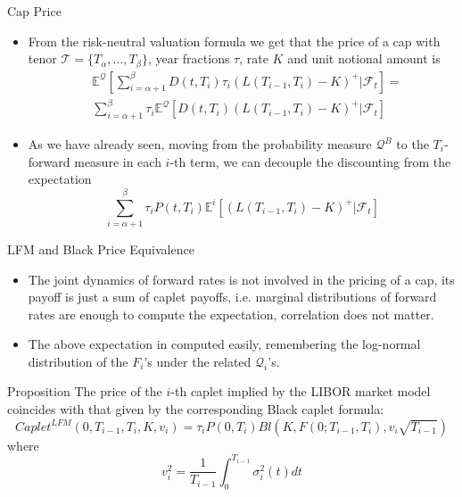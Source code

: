 \documentclass{beamer}
\begin{document}
\begin{frame}{Cap Price}
  \begin{itemize}
  \item From the risk-neutral valuation formula we get that the price of a cap with tenor $\mathcal{T} = \{T_\alpha,\ldots, T_\beta\}$, year fractions $\tau$, rate $K$ and unit notional amount is
    \begin{equation*}
      \begin{aligned}
	&\mathbb{E}^\mathcal{Q}\left[\sum_{i=\alpha+1}^{\beta}D(t,T_i)\tau_i(L(T_{i-1},T_i)-K)^+|\mathcal{F}_t\right]= \\
	&\sum_{i=\alpha+1}^{\beta}\tau_i\mathbb{E}^\mathcal{Q}[D(t,T_i)(L(T_{i-1},T_i)-K)^+|\mathcal{F}_t]
      \end{aligned}
    \end{equation*}
  \item As we have already seen, moving from the probability measure $\mathcal{Q}^B$ to the $T_i$-forward measure in each $i$-th term, we can decouple the discounting from the expectation
    \begin{equation*}
      \sum_{i=\alpha+1}^{\beta}\tau_iP(t,T_i)\mathbb{E}^i[(L(T_{i-1},T_i)-K)^+|\mathcal{F}_t]
    \end{equation*}
  \end{itemize}
\end{frame}

\begin{frame}{LFM and Black Price Equivalence}
  \begin{itemize}
  \item The joint dynamics of forward rates is not involved in the pricing of a cap, its payoff is just a sum of caplet payoffs, i.e. marginal distributions of forward rates are enough to compute the expectation, correlation does not matter. 
  \item The above expectation in computed easily, remembering the log-normal distribution of the $F_i$’s under the related $\mathcal{Q}_i$’s.
  \end{itemize}
  
  \begin{block}{Proposition}
    The price of the $i$-th caplet implied by the LIBOR market model coincides with that given by the corresponding Black caplet formula:
    \begin{equation}
      Caplet^{LFM}(0, T_{i-1}, T_i, K, v_i)= \tau_i P(0, T_i) Bl(K, F(0; T_{i-1}, T_i), v_i\sqrt{T_{i-1}})
    \end{equation}
    where
    \begin{equation}
      v_i^2 = \frac{1}{T_{i-1}}\int_0^{T_{i-1}}\sigma_i^2(t)dt
    \end{equation}
  \end{block}
\end{frame}
\end{document}
